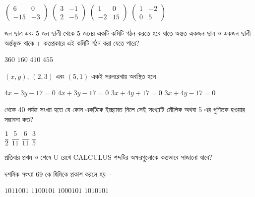 \documentclass[addpoints]{exam}
\begin{document}
\begin{questions}
\begin{oneparchoices}
\choice $ \begin{pmatrix}
6 & 0\\
-15 & -3
\end{pmatrix} $
\choice  $ \begin{pmatrix}
3 & -1\\
2 & -5
\end{pmatrix} $
\choice $ \begin{pmatrix}
1 & 0\\
-2 & 15
\end{pmatrix} $
\choice $ \begin{pmatrix}
1 & -2\\
0 & 5
\end{pmatrix} $
\end{oneparchoices}

 জন ছাত্র এবং 5 জন ছাত্রী থেকে 5 জনের একটি কমিটি গঠন করতে হবে যাতে অন্তত একজন ছাত্র ও একজন ছাত্রী অর্ন্তভুক্ত থাকে । কতপ্রকারে এই কমিটি গঠন করা যেতে পারে?


\begin{oneparchoices}
\choice $ 360 $
\choice $ 160 $
\choice $ 410 $
\choice $ 455 $
\end{oneparchoices}

\question $ (x,y),\,(2,3) $ এবং $ (5,1) $ একই সরলরেখায় অবস্থিত হলে 

\begin{oneparchoices}
\choice $ 4x-3y-17=0 $
\choice $ 4x+3y-17=0 $
\choice $ 3x+4y+17=0 $
\choice $ 3x+4y-17=0 $
\end{oneparchoices}

 থেকে  40 পর্যন্ত সংখ্যা হতে যে কোন একটিকে ইচ্ছামত নিলে সেই সংখ্যাটি মৌলিক অথবা 5 এর গুণিতক হওয়ার সম্ভাবনা কত?

\begin{oneparchoices}
\choice $ \dfrac{1}{2} $
\choice $ \dfrac{5}{11} $
\choice $ \dfrac{6}{11} $
\choice $ \dfrac{3}{5} $
\end{oneparchoices}

\question  প্রতিবার প্রথম ও শেষে U  রেখে CALCULUS শব্দটির অক্ষরগুলোকে কতভাবে সাজানো যাবে?

\begin{oneparchoices}
\end{oneparchoices}

\question  দশমিক সংখ্যা 69 কে দ্বিমিকে প্রকাশ করলে হয় – 

\begin{oneparchoices}
\choice  $ 1011001 $
\choice  $ 1100101 $
\choice  $ 1000101 $
\choice  $ 1010101 $
\end{oneparchoices}


\end{questions}
\end{document}
